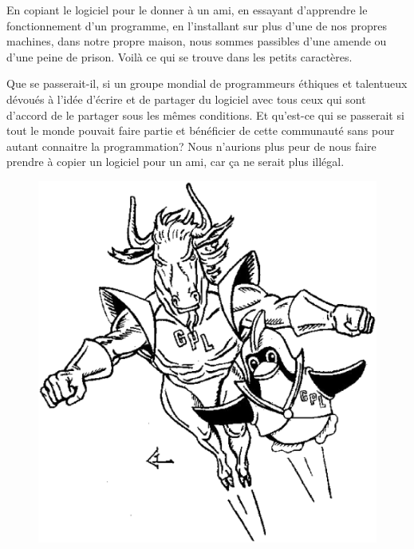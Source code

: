 \documentclass[twoside,12pt]{article}
\begin{document}
En copiant le logiciel pour le donner à un ami, en essayant d'apprendre le
fonctionnement d'un programme, en l'installant sur plus d'une de nos propres
machines, dans notre propre maison, nous sommes passibles d'une amende ou d'une
peine de prison. Voilà ce qui se trouve dans les petits caractères.


Que se passerait-il, si un groupe mondial de programmeurs éthiques et
talentueux dévoués à l'idée d'écrire et de partager du logiciel avec tous ceux
qui sont d'accord de le partager sous les mêmes conditions. Et qu'est-ce qui se
passerait si tout le monde pouvait faire partie et bénéficier de cette
communauté sans pour autant connaitre la programmation? Nous n'aurions plus
peur de nous faire prendre à copier un logiciel pour un ami, car ça ne serait
plus illégal.


\begin{figure}
 \begin{center}
   \includegraphics[scale=0.23]{dynamic-duo-bw.eps}
 \end{center}
\end{figure}
\end{document}
